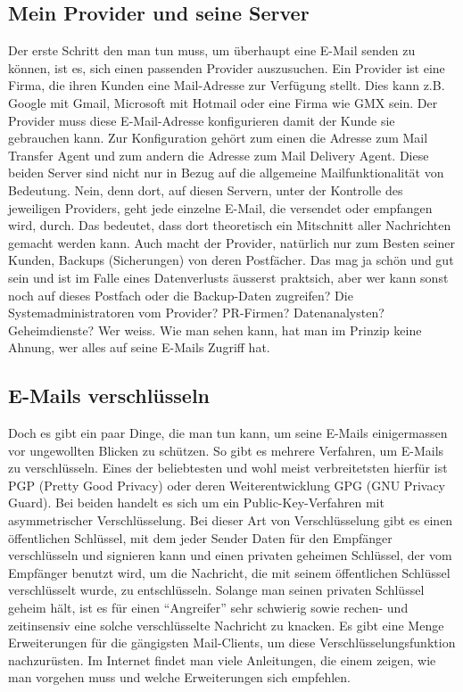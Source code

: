 \subsection{Mein Provider und seine Server}
Der erste Schritt den man tun muss, um überhaupt eine E-Mail senden zu können, ist es, sich einen passenden Provider auszusuchen. Ein Provider ist eine Firma, die ihren Kunden eine Mail-Adresse zur Verfügung stellt. Dies kann z.B. Google mit Gmail, Microsoft mit Hotmail oder eine Firma wie GMX sein. Der Provider muss diese E-Mail-Adresse konfigurieren damit der Kunde sie gebrauchen kann. Zur Konfiguration gehört zum einen die Adresse zum Mail Transfer Agent und zum andern die Adresse zum Mail Delivery Agent.
Diese beiden Server sind nicht nur in Bezug auf die allgemeine Mailfunktionalität von Bedeutung. Nein, denn dort, auf diesen Servern, unter der Kontrolle des jeweiligen Providers, geht jede einzelne E-Mail, die versendet oder empfangen wird, durch. Das bedeutet, dass dort theoretisch ein Mitschnitt aller Nachrichten gemacht werden kann. Auch macht der Provider, natürlich nur zum Besten seiner Kunden, Backups (Sicherungen) von deren Postfächer. Das mag ja schön und gut sein und ist im Falle eines Datenverlusts äusserst praktsich, aber wer kann sonst noch auf dieses Postfach oder die Backup-Daten zugreifen? Die Systemadministratoren vom Provider? PR-Firmen? Datenanalysten? Geheimdienste? Wer weiss.
Wie man sehen kann, hat man im Prinzip keine Ahnung, wer alles auf seine E-Mails Zugriff hat.

\subsection{E-Mails verschlüsseln}
Doch es gibt ein paar Dinge, die man tun kann, um seine E-Mails einigermassen vor ungewollten Blicken zu schützen.
So gibt es mehrere Verfahren, um E-Mails zu verschlüsseln. Eines der beliebtesten und wohl meist verbreitetsten hierfür ist PGP (Pretty Good Privacy) oder deren Weiterentwicklung GPG (GNU Privacy Guard).
Bei beiden handelt es sich um ein Public-Key-Verfahren mit asymmetrischer Verschlüsselung. Bei dieser Art von Verschlüsselung gibt es einen öffentlichen Schlüssel, mit dem jeder Sender Daten für den Empfänger verschlüsseln und signieren kann und einen privaten geheimen Schlüssel, der vom Empfänger benutzt wird, um die Nachricht, die mit seinem öffentlichen Schlüssel verschlüsselt wurde, zu entschlüsseln.
Solange man seinen privaten Schlüssel geheim hält, ist es für einen ``Angreifer'' sehr schwierig sowie rechen- und zeitinsensiv eine solche verschlüsselte Nachricht zu knacken.
Es gibt eine Menge Erweiterungen für die gängigsten Mail-Clients, um diese Verschlüsselungsfunktion nachzurüsten. Im Internet findet man viele Anleitungen, die einem zeigen, wie man vorgehen muss und welche Erweiterungen sich empfehlen.

